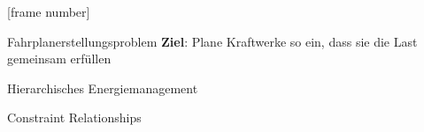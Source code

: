 

{

[frame number]{}



\begin{frame}{Fahrplanerstellungsproblem}
\textbf{Ziel}: Plane Kraftwerke so ein, dass sie die \alert{Last} gemeinsam erfüllen

\end{frame}
}


\begin{frame}{Hierarchisches Energiemanagement}

\begin{figure}
\centering

\label{fig:hierarchical-decomposition}
\end{figure}
\end{frame}


\begin{frame}{Constraint Relationships}
\begin{figure}
\centering

\end{figure}
\vspace*{-2.4ex}
\end{frame}

